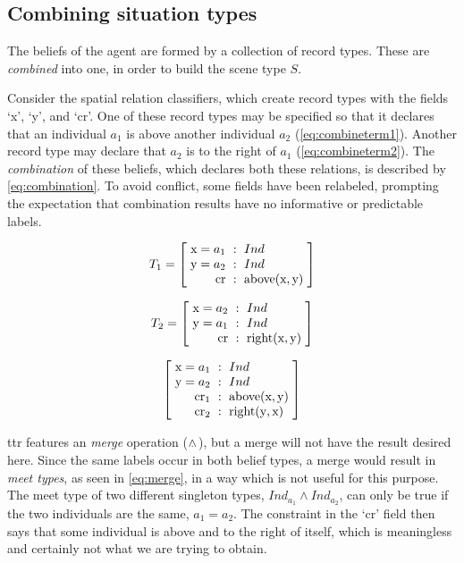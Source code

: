 \subsection{Combining situation types}
\label{sec:combine}

The beliefs of the agent are formed by a collection of record types.
These are \textit{combined} into one, in order to build the scene type $S$.

Consider the spatial relation classifiers, which create record types with the fields `x', `y', and `cr'.
One of these record types may be specified so that it declares that an individual $a_1$ is above another individual $a_2$ (\autoref{eq:combineterm1}).
Another record type may declare that $a_2$ is to the right of $a_1$ (\autoref{eq:combineterm2}).
The \textit{combination} of these beliefs, which declares both these relations, is described by \autoref{eq:combination}.
To avoid conflict, some fields have been relabeled, prompting the expectation that combination results have no informative or predictable labels.

\begin{equation} \label{eq:combineterm1}
T_1 = \rec{
    \text{x}=a_1 &:& Ind \\
    \text{y}=a_2 &:& Ind \\
    \text{cr} &:& \text{above}(\text{x}, \text{y})
    }
\end{equation}

\begin{equation} \label{eq:combineterm2}
T_2 = \rec{
    \text{x}=a_2 &:& Ind \\
    \text{y}=a_1 &:& Ind \\
    \text{cr} &:& \text{right}(\text{x}, \text{y})
    }
\end{equation}

\begin{equation} \label{eq:combination}
\rec{
    \text{x}=a_1 &:& Ind \\
    \text{y}=a_2 &:& Ind \\
    \text{cr}_1 &:& \text{above}(\text{x}, \text{y}) \\
    \text{cr}_2 &:& \text{right}(\text{y}, \text{x})
    }
\end{equation}

\gls{ttr} features an \textit{merge} operation ($\mathrel{\wedge_{\mkern-10mu\cdot\mkern6mu}}$), but a merge will not have the result desired here.
Since the same labels occur in both belief types, a merge would result in \textit{meet types}, as seen in \autoref{eq:merge}, in a way which is not useful for this purpose.
The meet type of two different singleton types, $Ind_{a_1} \wedge Ind_{a_2}$, can only be true if the two individuals are the same, $a_1 = a_2$.
The constraint in the `cr' field then says that some individual is above and to the right of itself, which is meaningless and certainly not what we are trying to obtain.

